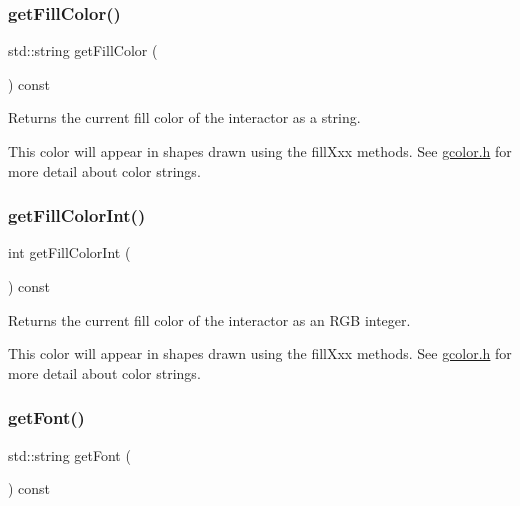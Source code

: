 \subsubsection{\texorpdfstring{get\+Fill\+Color()}{getFillColor()}}
{\footnotesize\ttfamily std\+::string get\+Fill\+Color (\begin{DoxyParamCaption}{ }\end{DoxyParamCaption}) const\hspace{0.3cm}{\ttfamily [virtual]}}



Returns the current fill color of the interactor as a string. 

This color will appear in shapes drawn using the fill\+Xxx methods. See \mbox{\hyperlink{gcolor_8h_source}{gcolor.\+h}} for more detail about color strings. \mbox{\label{classsgl_1_1GDrawingSurface_a88f4508d9271c4b5f5b5d6b780f223d0}} 
\subsubsection{\texorpdfstring{get\+Fill\+Color\+Int()}{getFillColorInt()}}
{\footnotesize\ttfamily int get\+Fill\+Color\+Int (\begin{DoxyParamCaption}{ }\end{DoxyParamCaption}) const\hspace{0.3cm}{\ttfamily [virtual]}}



Returns the current fill color of the interactor as an R\+GB integer. 

This color will appear in shapes drawn using the fill\+Xxx methods. See \mbox{\hyperlink{gcolor_8h_source}{gcolor.\+h}} for more detail about color strings. \mbox{\label{classsgl_1_1GDrawingSurface_a894a5502900794eeb27d084c21f1d77d}} 
\subsubsection{\texorpdfstring{get\+Font()}{getFont()}}
{\footnotesize\ttfamily std\+::string get\+Font (\begin{DoxyParamCaption}{ }\end{DoxyParamCaption}) const\hspace{0.3cm}{\ttfamily [virtual]}}



